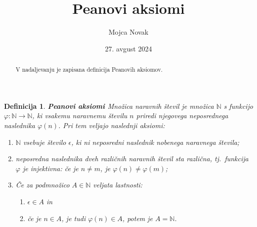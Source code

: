 \documentclass[a4paper, 11pt]{article}
\title{Peanovi aksiomi}
\author{Mojca Novak}
\date{27. avgust 2024}
\newcommand{\N}{\mathbb{N}}
\newtheorem{definicija}{Definicija}}
\begin{document}
    \maketitle

    \begin{abstract}
        V nadaljevanju je zapisana definicija Peanovih aksiomov.
    \end{abstract}

    \begin{definicija}
        \textbf{Peanovi aksiomi \cite{zapiski}}
        Množica naravnih števil je množica $\N$ s funkcijo $\varphi : \N \rightarrow \N$, 
        ki vsakemu naravnemu številu $n$ priredi njegovega neposrednega naslednika $\varphi(n)$. 
        Pri tem veljajo naslednji aksiomi:
        \begin{enumerate}
            \item $\N$ vsebuje število $\epsilon$, ki ni neposredni naslednik nobenega naravnega števila;
            \item neposredna naslednika dveh različnih naravnih števil sta različna, tj.\ funkcija $\varphi$ je injektivna: 
            če je $n \neq m$, je $\varphi(n) \neq \varphi(m)$;
            \item Če za podmnožico $A \in \N$ veljata lastnosti:
            \begin{enumerate}
                \item $\epsilon \in A$ in
                \item če je $n \in A$, je tudi $\varphi(n) \in A$,
                potem je $A = \N$.
            \end{enumerate}
        \end{enumerate}
    \end{definicija}

    
    
    
\end{document}
